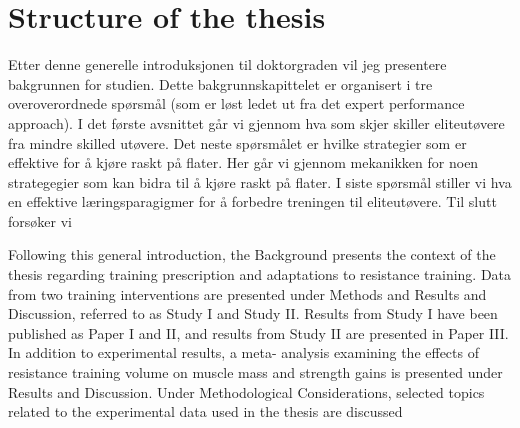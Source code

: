  


\section{Structure of the thesis}
Etter denne generelle introduksjonen til doktorgraden vil jeg presentere bakgrunnen for studien. Dette bakgrunnskapittelet er organisert i tre overoverordnede spørsmål (som er løst ledet ut fra det expert performance approach). I det første avsnittet går vi gjennom hva som skjer skiller eliteutøvere fra mindre skilled utøvere. Det neste spørsmålet er hvilke strategier som er effektive for å kjøre raskt på flater. Her går vi gjennom mekanikken for noen strategegier som kan bidra til å kjøre raskt på flater. I siste spørsmål stiller vi hva en effektive læringsparagigmer for å forbedre treningen til eliteutøvere. Til slutt forsøker vi 


Following this general introduction, the Background presents the context of the thesis
regarding training prescription and adaptations to resistance training. Data from two
training interventions are presented under Methods and Results and Discussion, referred to
as Study I and Study II. Results from Study I have been published as Paper I and II, and
results from Study II are presented in Paper III. In addition to experimental results, a meta-
analysis examining the effects of resistance training volume on muscle mass and strength
gains is presented under Results and Discussion. Under Methodological Considerations,
selected topics related to the experimental data used in the thesis are discussed
